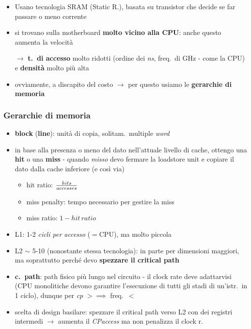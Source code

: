 \begin{itemize}
  \item Usano tecnologia SRAM (Static R.), basata su transistor che decide se far passare o meno corrente
  \item si trovano sulla motherboard \textbf{molto vicino alla CPU}: anche questo aumenta la velocit\`a 
  \item[$\rightarrow$] \textbf{t.~di accesso} molto ridotti (ordine dei \textit{ns}, freq.~di GHz - come la CPU) e \textbf{densit\`a} molto pi\`u alta
  \item ovviamente, a discapito del costo $\rightarrow$ per questo usiamo le \textbf{gerarchie di memoria}
\end{itemize}

\subsubsection{Gerarchie di memoria}
\begin{itemize}
  \item \textbf{block} (\textbf{line}): unit\`a di copia, solitam.~multiple \textit{word}
  \item in base alla presenza o meno del dato nell'attuale livello di cache, ottengo una \textbf{hit} o una \textbf{miss} - quando \textit{misso} devo fermare la loadstore unit e copiare il dato dalla cache inferiore (e cos\`i via)
  \begin{itemize}
    \item hit ratio: $hits\over accesses$
    \item miss penalty: tempo necessario per gestire la miss
    \item miss ratio: $1 - hit\,ratio$
  \end{itemize}
\end{itemize}

  \begin{example}[frametitle={Velocit\`a delle cache}]
    \begin{itemize}
      \item L1: 1-2 \textit{cicli per accesso} ($=$CPU), ma molto piccola
      \item L2 $\sim$ 5-10 (nonostante stessa tecnologia): in parte per dimensioni maggiori, ma soprattutto perch\'e devo \textbf{spezzare il critical path}
      \item \textbf{c.~path}: path fisico pi\`u lungo nel circuito - il clock rate deve adattarvisi (CPU monolitiche devono garantire l'esecuzione di tutti gli stadi di un'istr.~in 1 ciclo), dunque per \textit{cp} $> \implies $ freq.~$<$
      \item scelta di design basilare: spezzare il critical path verso L2 con dei registri intermedi $\rightarrow$ aumenta il \textit{CPaccess} ma non penalizza il clock r.
    \end{itemize}
  \end{example}

